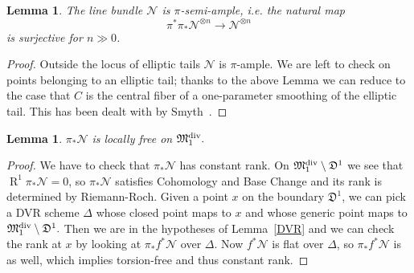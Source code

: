\documentclass[11pt]{amsart}
\renewcommand{\to}{\rightarrow}
\newcommand{\MM}{\mathfrak M}
\newcommand{\R}{\operatorname{R}}
\newcommand{\dvr}{\Delta}
\theoremstyle{plain}
\newtheorem{lem}[thm]{Lemma}
\theoremstyle{definition}
\begin{document}
\begin{lem}\label{lemma:semiample}
The line bundle $\mathcal N$ is $\pi$-semi-ample, i.e. the natural map
\[\pi^*\pi_*\mathcal N^{\otimes n}\to \mathcal N^{\otimes n}\]
is surjective for $n\gg 0$.
\end{lem}
\begin{proof}
Outside the locus of elliptic tails $\mathcal N$ is $\pi$-ample. We are left to check on points belonging to an elliptic tail; thanks to the above Lemma we can reduce to the case that $C$ is the central fiber of a one-parameter smoothing of the elliptic tail. This has been dealt with by Smyth~\cite[Lemma~2.12]{SMY1}.
\end{proof}

\begin{lem}
$\pi_*\mathcal N$ is locally free on $\MM_1^{\rm{div}}.$
\end{lem}
\begin{proof}\cite[Proposition~3.7.2.1]{RSPW}
We have to check that $\pi_*\mathcal N$ has constant rank.
On $\MM_1^{\rm{div}}\setminus \mathfrak{D}^1$ we see that $\R^1\pi_*\mathcal N=0$, so $\pi_*\mathcal N$ satisfies Cohomology and Base Change and its rank is determined by Riemann-Roch.
Given a point $x$ on the boundary $\mathfrak{D}^1$, we can pick a DVR scheme $\dvr$ whose closed point maps to $x$ and whose generic point maps to $\MM_1^{\rm{div}}\setminus \mathfrak{D}^1.$ Then we are in the hypotheses of Lemma~\ref{DVR} and we can check the rank at $x$ by looking at $\pi_*f^*\mathcal N$ over $\dvr.$ Now $f^*\mathcal N$ is flat over $\dvr$, so $\pi_*f^*\mathcal N$ is as well, which implies torsion-free and thus constant rank.
\end{proof}
\end{document}
